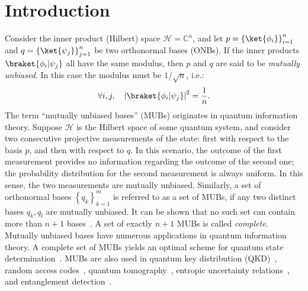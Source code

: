 \documentclass[referee,sn-mathphys-num]{sn-jnl}%
\theoremstyle{thmstyleone}%
\theoremstyle{thmstyletwo}%
\theoremstyle{remark}
\theoremstyle{thmstylethree}%
\newcommand{\abs}[1]{\left\vert#1\right\vert}
\begin{document}
\section{Introduction}\label{intro}
Consider the inner product (Hilbert) space $ \mathcal{H} = \mathbb{C}^n $, and let $ p = \left\{ \ket{\phi_i} \right\}_{i=1}^n $ and $ q = \left\{ \ket{\psi_j} \right\}_{j=1}^n $ be two orthonormal bases (ONBs). If the inner products $ \braket{ \phi_i \vert \psi_j } $ all have the same modulus, then $p$ and $q$ are said to be \textit{mutually unbiased}. In this case the modulus must be $ 1 / \sqrt{n} $, i.e.:
\begin{equation}\label{MUB_def}
	\forall i, j, \quad \abs{ \braket{ \phi_i \vert \psi_j } }^2 = \frac{1}{n} .
\end{equation}
The term ``mutually unbiased bases'' (MUBs) originates in quantum information theory. Suppose $ \mathcal{H} $ is the Hilbert space of some quantum system, and consider two consecutive projective measurements of the state: first with respect to the basis $p$, and then with respect to $q$. In this scenario, the outcome of the first measurement provides no information regarding the outcome of the second one; the probability distribution for the second measurement is always uniform. In this sense, the two measurements are mutually unbiased.
Similarly, a set of orthonormal bases $ \left\{ q_k \right\}_{k=1}^m $ is referred to as a set of MUBs, if any two distinct bases $ q_k, q_l $ are mutually unbiased. It can be shown that no such set can contain more than $n+1$ bases~\cite{wootters1989optimal}. A set of exactly $n+1$ MUBs is called \textit{complete}.
Mutually unbiased bases have numerous applications in quantum information theory. A complete set of MUBs yields an optimal scheme for quantum state determination~\cite{ivonovic1981geometrical,wootters1989optimal,PhysRevLett.105.030406}.
MUBs are also used in quantum key distribution (QKD)~\cite{PhysRevLett.67.661,PhysRevLett.81.3018,PhysRevLett.88.127902,PhysRevLett.92.057901,RevModPhys.81.1301,pirandola2020advances,ashkenazy2024photon}, random access codes~\cite{PhysRevA.78.022310,PhysRevLett.114.170502}, quantum tomography~\cite{PhysRevA.85.052120,Lima:11}, entropic uncertainty relations~\cite{PhysRevA.91.042133,PhysRevA.104.062204,rastegin2013uncertainty,PhysRevA.79.022104}, and entanglement detection~\cite{PhysRevA.86.022311,tavakoli2021mutually,hiesmayr2021detecting}.
\end{document}
